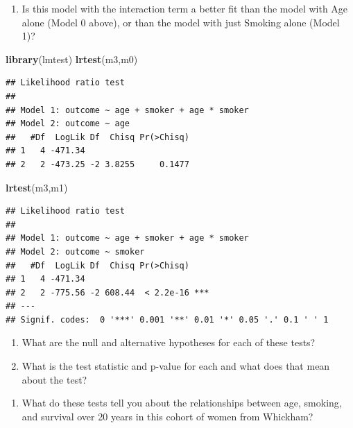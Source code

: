 \documentclass[]{article}
\newenvironment{Shaded}{\begin{snugshade}}{\end{snugshade}}
\newcommand{\KeywordTok}[1]{\textcolor[rgb]{0.13,0.29,0.53}{\textbf{#1}}}
\newcommand{\NormalTok}[1]{#1}
\providecommand{\tightlist}{%
  \setlength{\itemsep}{0pt}\setlength{\parskip}{0pt}}
\begin{document}
\vspace{3in}

\begin{enumerate}
\def\labelenumi{\arabic{enumi}.}
\setcounter{enumi}{12}
\tightlist
\item
  Is this model with the interaction term a better fit than the model
  with Age alone (Model 0 above), or than the model with just Smoking
  alone (Model 1)?
\end{enumerate}

\begin{Shaded}
\begin{Highlighting}[]
\KeywordTok{library}\NormalTok{(lmtest)}
\KeywordTok{lrtest}\NormalTok{(m3,m0)}
\end{Highlighting}
\end{Shaded}

\begin{verbatim}
## Likelihood ratio test
## 
## Model 1: outcome ~ age + smoker + age * smoker
## Model 2: outcome ~ age
##   #Df  LogLik Df  Chisq Pr(>Chisq)
## 1   4 -471.34                     
## 2   2 -473.25 -2 3.8255     0.1477
\end{verbatim}

\begin{Shaded}
\begin{Highlighting}[]
\KeywordTok{lrtest}\NormalTok{(m3,m1)}
\end{Highlighting}
\end{Shaded}

\begin{verbatim}
## Likelihood ratio test
## 
## Model 1: outcome ~ age + smoker + age * smoker
## Model 2: outcome ~ smoker
##   #Df  LogLik Df  Chisq Pr(>Chisq)    
## 1   4 -471.34                         
## 2   2 -775.56 -2 608.44  < 2.2e-16 ***
## ---
## Signif. codes:  0 '***' 0.001 '**' 0.01 '*' 0.05 '.' 0.1 ' ' 1
\end{verbatim}

\begin{enumerate}
\def\labelenumi{\alph{enumi}.}
\item
  What are the null and alternative hypotheses for each of these tests?
  \vspace{2in}
\item
  What is the test statistic and p-value for each and what does that
  mean about the test?
\end{enumerate}

\vspace{2in}

\begin{enumerate}
\def\labelenumi{\alph{enumi}.}
\setcounter{enumi}{2}
\tightlist
\item
  What do these tests tell you about the relationships between age,
  smoking, and survival over 20 years in this cohort of women from
  Whickham? \vspace{2in}
\end{enumerate}
\end{document}
